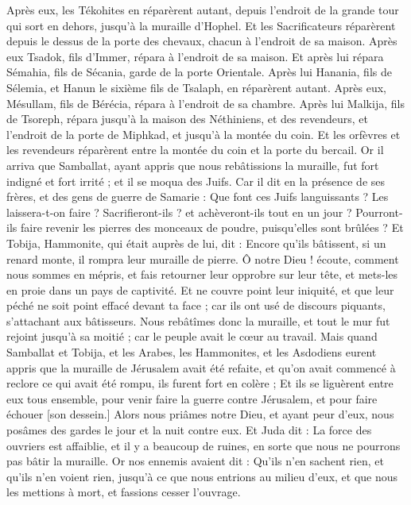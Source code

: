 \begin{multicols}{2}
Après eux, les Tékohites en réparèrent autant, depuis l'endroit de la grande tour qui sort en dehors, jusqu'à la muraille d'Hophel.
Et les Sacrificateurs réparèrent depuis le dessus de la porte des chevaux, chacun à l'endroit de sa maison.
Après eux Tsadok, fils d'Immer, répara à l'endroit de sa maison. Et après lui répara Sémahia, fils de Sécania, garde de la porte Orientale.
Après lui Hanania, fils de Sélemia, et Hanun le sixième fils de Tsalaph, en réparèrent autant. Après eux, Mésullam, fils de Bérécia, répara à l'endroit de sa chambre.
Après lui Malkija, fils de Tsoreph, répara jusqu'à la maison des Néthiniens, et des revendeurs, et l'endroit de la porte de Miphkad, et jusqu'à la montée du coin.
Et les orfèvres et les revendeurs réparèrent entre la montée du coin et la porte du bercail.
\VerseOne{}Or il arriva que Samballat, ayant appris que nous rebâtissions la muraille, fut fort indigné et fort irrité ; et il se moqua des Juifs.
Car il dit en la présence de ses frères, et des gens de guerre de Samarie : Que font ces Juifs languissants ? Les laissera-t-on faire ? Sacrifieront-ils ? et achèveront-ils tout en un jour ? Pourront-ils faire revenir les pierres des monceaux de poudre, puisqu'elles sont brûlées ?
Et Tobija, Hammonite, qui était auprès de lui, dit : Encore qu'ils bâtissent, si un renard monte, il rompra leur muraille de pierre.
Ô notre Dieu ! écoute, comment nous sommes en mépris, et fais retourner leur opprobre sur leur tête, et mets-les en proie dans un pays de captivité.
Et ne couvre point leur iniquité, et que leur péché ne soit point effacé devant ta face ; car ils ont usé de discours piquants, s'attachant aux bâtisseurs.
Nous rebâtîmes donc la muraille, et tout le mur fut rejoint jusqu'à sa moitié ; car le peuple avait le cœur au travail.
Mais quand Samballat et Tobija, et les Arabes, les Hammonites, et les Asdodiens eurent appris que la muraille de Jérusalem avait été refaite, et qu'on avait commencé à reclore ce qui avait été rompu, ils furent fort en colère ;
Et ils se liguèrent entre eux tous ensemble, pour venir faire la guerre contre Jérusalem, et pour faire échouer [son dessein.]
Alors nous priâmes notre Dieu, et ayant peur d'eux, nous posâmes des gardes le jour et la nuit contre eux.
Et Juda dit : La force des ouvriers est affaiblie, et il y a beaucoup de ruines, en sorte que nous ne pourrons pas bâtir la muraille.
Or nos ennemis avaient dit : Qu'ils n'en sachent rien, et qu'ils n'en voient rien, jusqu'à ce que nous entrions au milieu d'eux, et que nous les mettions à mort, et fassions cesser l'ouvrage.

\end{multicols}
